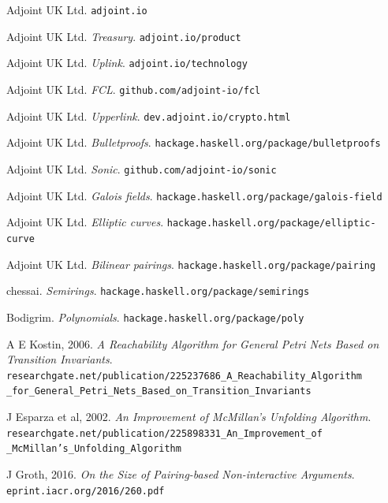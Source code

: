 \documentclass[11pt]{article}
\begin{document}
\begin{thebibliography}{20}

Adjoint UK Ltd. \texttt{adjoint.io}

Adjoint UK Ltd. \emph{Treasury}. \texttt{adjoint.io/product}

Adjoint UK Ltd. \emph{Uplink}. \texttt{adjoint.io/technology}

Adjoint UK Ltd. \emph{FCL}. \texttt{github.com/adjoint-io/fcl}

Adjoint UK Ltd. \emph{Upperlink}. \texttt{dev.adjoint.io/crypto.html}

Adjoint UK Ltd. \emph{Bulletproofs}. \texttt{hackage.haskell.org/package/bulletproofs}

Adjoint UK Ltd. \emph{Sonic}. \texttt{github.com/adjoint-io/sonic}

Adjoint UK Ltd. \emph{Galois fields}. \texttt{hackage.haskell.org/package/galois-field}

Adjoint UK Ltd. \emph{Elliptic curves}. \texttt{hackage.haskell.org/package/elliptic-curve}

Adjoint UK Ltd. \emph{Bilinear pairings}. \texttt{hackage.haskell.org/package/pairing}

chessai. \emph{Semirings}. \texttt{hackage.haskell.org/package/semirings}

Bodigrim. \emph{Polynomials}. \texttt{hackage.haskell.org/package/poly}

A E Kostin, 2006. \emph{A Reachability Algorithm for General Petri Nets Based on Transition Invariants}. \texttt{researchgate.net/publication/225237686\_A\_Reachability\_Algorithm} \\
\texttt{\_for\_General\_Petri\_Nets\_Based\_on\_Transition\_Invariants}

J Esparza et al, 2002. \emph{An Improvement of McMillan's Unfolding Algorithm}. \\
\texttt{researchgate.net/publication/225898331\_An\_Improvement\_of} \\
\texttt{\_McMillan's\_Unfolding\_Algorithm}

J Groth, 2016. \emph{On the Size of Pairing-based Non-interactive Arguments}. \\ \texttt{eprint.iacr.org/2016/260.pdf}


\end{thebibliography}
\end{document}
